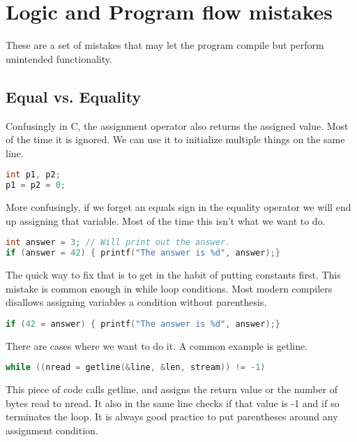 \section{Logic and Program flow mistakes}

These are a set of mistakes that may let the program compile but perform unintended functionality.

\subsection{Equal vs. Equality}

Confusingly in C, the assignment operator also returns the assigned value.
Most of the time it is ignored.
We can use it to initialize multiple things on the same line.

\begin{lstlisting}[language=C]
int p1, p2;
p1 = p2 = 0;
\end{lstlisting}

More confusingly, if we forget an equals sign in the equality operator we will end up assigning that variable.
Most of the time this isn't what we want to do.

\begin{lstlisting}[language=C]
int answer = 3; // Will print out the answer.
if (answer = 42) { printf("The answer is %d", answer);}
\end{lstlisting}

The quick way to fix that is to get in the habit of putting constants first.
This mistake is common enough in while loop conditions.
Most modern compilers disallows assigning variables a condition without parenthesis.

\begin{lstlisting}[language=C]
  if (42 = answer) { printf("The answer is %d", answer);}
\end{lstlisting}

There are cases where we want to do it.
A common example is getline.

\begin{lstlisting}[language=C]
while ((nread = getline(&line, &len, stream)) != -1)
\end{lstlisting}

This piece of code calls getline, and assigns the return value or the number of bytes read to nread.
It also in the same line checks if that value is -1 and if so terminates the loop.
It is always good practice to put parentheses around any assignment condition.

